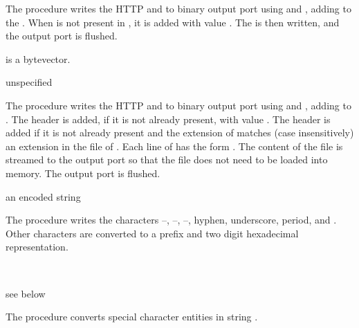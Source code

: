 The  procedure writes the HTTP  and
 to binary output port  using
 and , adding
 to the . When
 is not present in , it is added
with value . The  is then written, and
the output port is flushed.

 is a bytevector.

\begin{procedure}
\end{procedure}
\returns{} unspecified

The  procedure writes the HTTP 
and  to binary output port  using
 and , adding
 to .  The 
header is added, if it is not already present, with value
. The  header is added if
it is not already present and the extension of  matches
(case insensitively) an extension in the  file of
. Each line of  has the form
. The content of
the file is streamed to the output port so that the file does not need
to be loaded into memory. The output port is flushed.

\begin{procedure}
\end{procedure}
\returns{} an encoded string

The  procedure writes the characters
--, --,
--, hyphen, underscore, period, and
\code{\~}. Other characters are converted to a \code{\%} prefix
and two digit hexadecimal representation.

\begin{procedure}
   \\
  \strut
\end{procedure}
\returns{} see below

The  procedure converts special character entities
in string .

